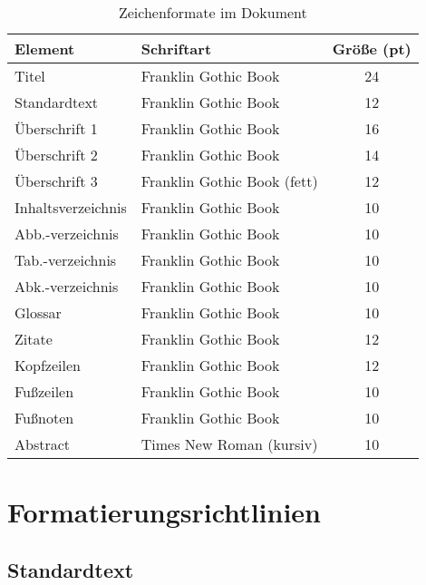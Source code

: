 \begin{table}[h]
	\centering
	\caption{Zeichenformate im Dokument}
	\label{tab:zeichenformate}
	\begin{tabular}{|l|l|c|}
		\hline
		\textbf{Element}   & \textbf{Schriftart}         & \textbf{Größe (pt)} \\
		\hline
		Titel              & Franklin Gothic Book        & 24                  \\
		Standardtext       & Franklin Gothic Book        & 12                  \\
		Überschrift 1      & Franklin Gothic Book        & 16                  \\
		Überschrift 2      & Franklin Gothic Book        & 14                  \\
		Überschrift 3      & Franklin Gothic Book (fett) & 12                  \\
		\hline
		Inhaltsverzeichnis & Franklin Gothic Book        & 10                  \\
		Abb.-verzeichnis   & Franklin Gothic Book        & 10                  \\
		Tab.-verzeichnis   & Franklin Gothic Book        & 10                  \\
		Abk.-verzeichnis   & Franklin Gothic Book        & 10                  \\
		Glossar            & Franklin Gothic Book        & 10                  \\
		\hline
		Zitate             & Franklin Gothic Book        & 12                  \\
		Kopfzeilen         & Franklin Gothic Book        & 12                  \\
		Fußzeilen          & Franklin Gothic Book        & 10                  \\
		Fußnoten           & Franklin Gothic Book        & 10                  \\
		Abstract           & Times New Roman (kursiv)    & 10                  \\
		\hline
	\end{tabular}
\end{table}

\section{Formatierungsrichtlinien}
\label{sec:formatierungsrichtlinien}

\subsection{Standardtext}
\label{subsec:standardtext}

